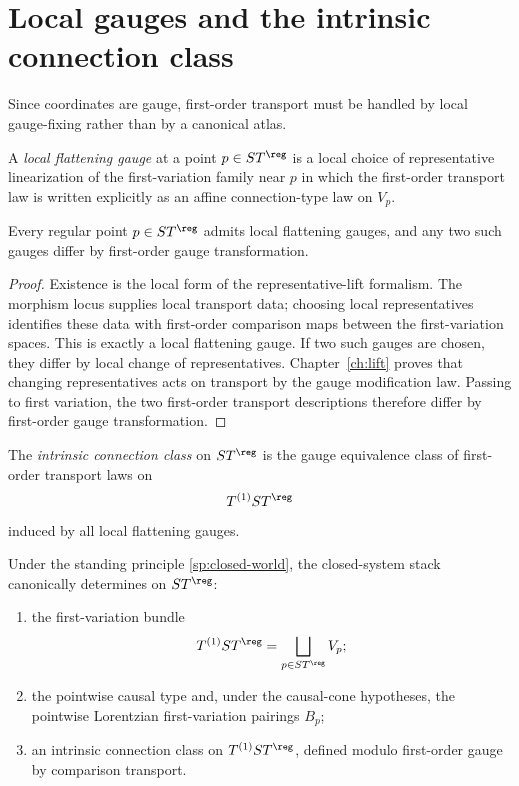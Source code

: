 \section{Local gauges and the intrinsic connection class}
\label{sec:intrinsic-connection-class}
Since coordinates are gauge, first-order transport must be handled by
local gauge-fixing rather than by a canonical atlas.
\begin{definition}
	A \emph{local flattening gauge} at a point \(p\in ST^{\reg}\) is a local
	choice of representative linearization of the first-variation family
	near \(p\) in which the first-order transport law is written explicitly
	as an affine connection-type law on \(V_p\).
\end{definition}
\begin{proposition}
	\label{prop:connection-flattening-gauges}
	Every regular point \(p\in ST^{\reg}\) admits local flattening gauges,
	and any two such gauges differ by first-order gauge transformation.
\end{proposition}
\begin{proof}
	Existence is the local form of the representative-lift formalism.  The
	morphism locus supplies local transport data; choosing local
	representatives identifies these data with first-order comparison maps
	between the first-variation spaces.  This is exactly a local flattening
	gauge.
	If two such gauges are chosen, they differ by local change of
	representatives.  Chapter~\ref{ch:lift} proves that changing
	representatives acts on transport by the gauge modification law.
	Passing to first variation, the two first-order transport descriptions
	therefore differ by first-order gauge transformation.
\end{proof}
\begin{definition}
	The \emph{intrinsic connection class} on \(ST^{\reg}\) is the gauge
	equivalence class of first-order transport laws on
	\[
		T^{(1)}ST^{\reg}
	\]
	induced by all local flattening gauges.
\end{definition}
\begin{theorem}
	\label{thm:connection-first-reconstruction}
	Under the standing principle \cref{sp:closed-world}, the closed-system
	stack canonically determines on \(ST^{\reg}\):
	\begin{enumerate}[label=\textup{(\roman*)}]
		\item
		      the first-variation bundle
		      \[
			      T^{(1)}ST^{\reg}
			      =
			      \bigsqcup_{p\in ST^{\reg}}V_p;
		      \]
		\item
		      the pointwise causal type and, under the causal-cone hypotheses, the
		      pointwise Lorentzian first-variation pairings \(B_p\);
		\item
		      an intrinsic connection class on \(T^{(1)}ST^{\reg}\), defined modulo
		      first-order gauge by comparison transport.
	\end{enumerate}
\end{theorem}
